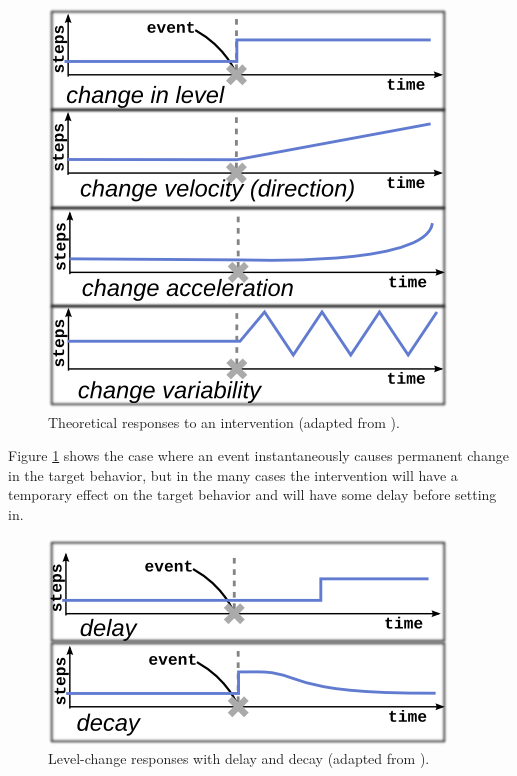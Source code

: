 \documentclass[preprint,journal]{vgtc}       %
\begin{document}
\begin{figure}
\centering
\includegraphics[width=0.9\columnwidth]{./img/exampleDynamicSignals.png}
\caption{Theoretical responses to an intervention (adapted from \cite{glass1975}).}
\label{fig:exampleSignals}
\end{figure}

Figure \ref{fig:exampleSignals} shows the case where an event instantaneously causes permanent change in the target behavior, but in the many cases the intervention will have a temporary effect on the target behavior and will have some delay before setting in. 

\begin{figure}
\centering
\includegraphics[width=0.9\columnwidth]{./img/exampleDynamicComplications.png}
\caption{Level-change responses with delay and decay (adapted from \cite{glass1975}).}
\label{fig:exampleComplications}
\end{figure}
\end{document}
